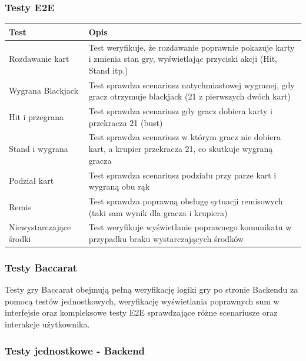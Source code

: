 \documentclass[a4paper,12pt]{article}
\begin{document}
\subsubsection*{Testy E2E}

\begin{tabularx}{\textwidth}{lX}
\toprule
\textbf{Test} & \textbf{Opis} \\
\midrule
Rozdawanie kart & Test weryfikuje, że rozdawanie poprawnie pokazuje karty i zmienia stan gry, wyświetlając przyciski akcji (Hit, Stand itp.) \\
Wygrana Blackjack & Test sprawdza scenariusz natychmiastowej wygranej, gdy gracz otrzymuje blackjack (21 z pierwszych dwóch kart) \\
Hit i przegrana & Test sprawdza scenariusz gdy gracz dobiera karty i przekracza 21 (bust) \\
Stand i wygrana & Test sprawdza scenariusz w którym gracz nie dobiera kart, a krupier przekracza 21, co skutkuje wygraną gracza \\
Podział kart & Test sprawdza scenariusz podziału przy parze kart i wygraną obu rąk \\
Remis & Test sprawdza poprawną obsługę sytuacji remisowych (taki sam wynik dla gracza i krupiera) \\
Niewystarczające środki & Test weryfikuje wyświetlanie poprawnego komunikatu w przypadku braku wystarczających środków \\
\bottomrule
\end{tabularx}


\subsubsection{Testy Baccarat}
Testy gry Baccarat obejmują pełną weryfikację logiki gry po stronie Backendu za pomocą testów jednostkowych, weryfikację wyświetlania poprawnych sum w interfejsie oraz kompleksowe testy E2E sprawdzające różne scenariusze oraz interakcje użytkownika.

\subsubsection*{Testy jednostkowe - Backend}
\end{document}
